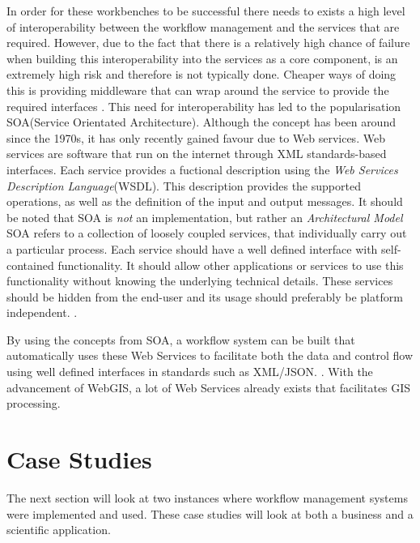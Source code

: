 \documentclass[11pt,twocolumn]{article}
\begin{document}
    In order for these workbenches to be successful there needs
    to exists a high level of interoperability between the
    workflow management and the services that are required.
    However, due to the fact that there is a relatively high
    chance of failure when building this interoperability into the
    services as a core component, is an extremely high risk
    and therefore is not typically done. Cheaper ways of
    doing this is providing middleware that can wrap around
    the service to provide the required interfaces
    \cite{Shegalov:2001:XWM:767132.767139}.
    This need for interoperability has led to the
    popularisation SOA(Service Orientated Architecture).
    Although the concept has been around since the 1970s,
    it has only recently gained favour due to Web services.
    Web services are software that run on the internet through
    XML standards-based interfaces. Each service provides
    a fuctional description using the \emph{Web Services
    Description Language}(WSDL). This description provides
    the supported operations, as well as the definition
    of the input and output messages.\cite{Tai:2004:CCW:1045658.1045680}
    It should be noted that SOA is \emph{not} an implementation,
    but rather an \emph{Architectural Model}
    SOA refers to a collection of loosely coupled services,
    that individually carry out a particular process. Each
    service should have a well defined interface with self-contained
    functionality. It should allow other applications
    or services to use this functionality without knowing
    the underlying technical details. These services should be
    hidden from the end-user and its usage should preferably
    be platform independent.
    \cite{Sanders:2008:SSA:1400549.1400595}.

    By using the concepts from SOA, a workflow system can
    be built that automatically uses these Web Services
    to facilitate both the data and control flow using
    well defined interfaces in standards such as XML/JSON.
    \cite{Shegalov:2001:XWM:767132.767139}. With the
    advancement of WebGIS, a lot  of Web Services already
    exists that facilitates GIS processing.


\section{Case Studies}
    The next section will look at two instances where
    workflow management systems were implemented and used.
    These case studies will look at both a business and a
    scientific application.
\end{document}
